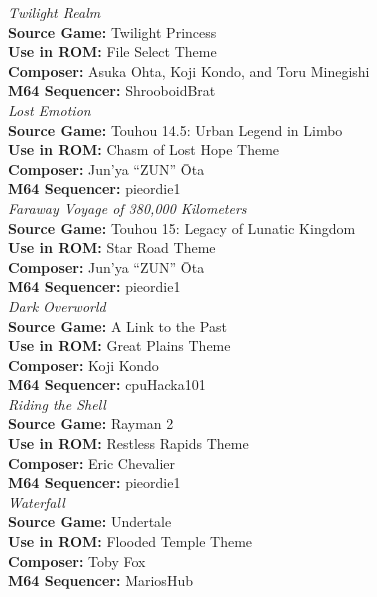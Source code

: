 \documentclass[11pt]{article}
\begin{document}
\textit{\Large Twilight Realm}\\
\textbf{\small Source Game:} Twilight Princess\\
\textbf{\small Use in ROM:} File Select Theme\\
\textbf{\small Composer:} Asuka Ohta, Koji Kondo, and Toru Minegishi\\
\textbf{\small M64 Sequencer:} ShrooboidBrat\\
\break
\textit{\Large Lost Emotion}\\
\textbf{\small Source Game:} Touhou 14.5: Urban Legend in Limbo\\
\textbf{\small Use in ROM:} Chasm of Lost Hope Theme\\
\textbf{\small Composer:} Jun'ya ``ZUN'' Ōta\\
\textbf{\small M64 Sequencer:} pieordie1\\
\break
\textit{\Large Faraway Voyage of 380,000 Kilometers}\\
\textbf{\small Source Game:} Touhou 15: Legacy of Lunatic Kingdom\\
\textbf{\small Use in ROM:} Star Road Theme\\
\textbf{\small Composer:} Jun'ya ``ZUN'' Ōta\\
\textbf{\small M64 Sequencer:} pieordie1\\
\break
\textit{\Large Dark Overworld}\\
\textbf{\small Source Game:} A Link to the Past\\
\textbf{\small Use in ROM:} Great Plains Theme\\
\textbf{\small Composer:} Koji Kondo\\
\textbf{\small M64 Sequencer:} cpuHacka101\\
\break
\textit{\Large Riding the Shell}\\
\textbf{\small Source Game:} Rayman 2\\
\textbf{\small Use in ROM:} Restless Rapids Theme\\
\textbf{\small Composer:} 	Eric Chevalier\\
\textbf{\small M64 Sequencer:} pieordie1\\
\break
\textit{\Large Waterfall}\\
\textbf{\small Source Game:} Undertale\\
\textbf{\small Use in ROM:} Flooded Temple Theme\\
\textbf{\small Composer:} Toby Fox\\
\textbf{\small M64 Sequencer:} MariosHub\\
\end{document}
